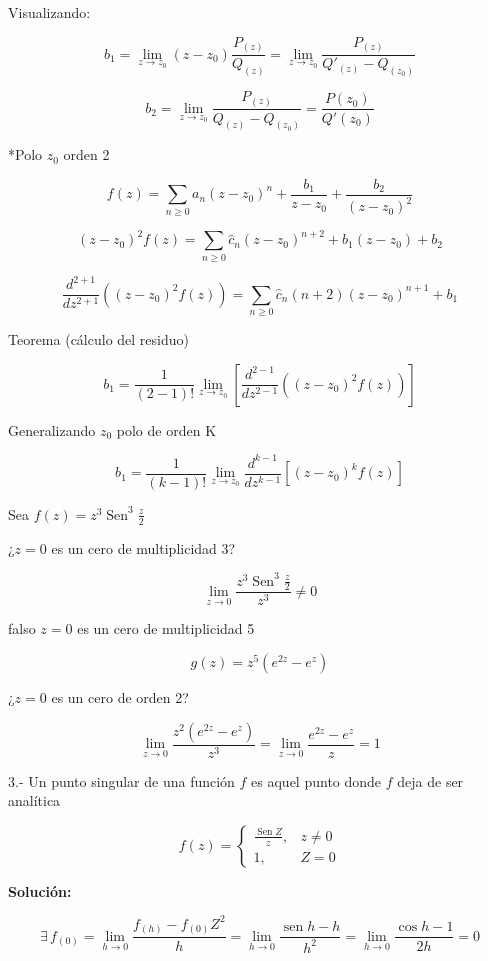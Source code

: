 \documentclass[a4paper,12pt]{article}
\begin{document}

Visualizando:

\[ b_1 = \lim_{z \to z_0} (z - z_0) \frac{P_{(z)}}{Q_{(z)}} = \lim_{z \to z_0} \frac{P_{(z)}}{Q'_{(z)} - Q_{(z_0)}} \]

\[ b_2 = \lim_{z \to z_0} \frac{P_{(z)}}{Q_{(z)} - Q_{(z_0)}} = \frac{P(z_0)}{Q'(z_0)} \]

*Polo $z_0$ orden 2

\[ f(z) = \sum_{n \geq 0} a_n (z - z_0)^n + \frac{b_1}{z - z_0} + \frac{b_2}{(z - z_0)^2} \]

\[ (z - z_0)^2 f(z) = \sum_{n \geq 0} \hat{c}_n (z - z_0)^{n+2} + b_1 (z - z_0) + b_2 \]

\[ \frac{d^{2+1}}{dz^{2+1}} \left((z - z_0)^2 f(z)\right) = \sum_{n \geq 0} \hat{c}_n (n + 2) (z - z_0)^{n+1} + b_1 \]

Teorema (cálculo del residuo)

\[ b_1 = \frac{1}{(2-1)!} \lim_{z \to z_0} \left[ \frac{d^{2-1}}{dz^{2-1}} \left((z - z_0)^2 f(z)\right) \right] \]

Generalizando $z_0$ polo de orden K

\[ b_1 = \frac{1}{(k-1)!} \lim_{z \to z_0} \frac{d^{k-1}}{dz^{k-1}} \left[(z - z_0)^k f(z)\right] \]

Sea $f(z) = z^3 \operatorname{Sen}^3 \frac{z}{2}$

¿$z = 0$ es un cero de multiplicidad 3?

\[ \lim_{z \to 0} \frac{z^3 \operatorname{Sen}^3 \frac{z}{2}}{z^3} \neq 0 \]

falso $z = 0$ es un cero de multiplicidad 5

\[ g(z) = z^5 \left(e^{2z} - e^z\right) \]



¿$z = 0$ es un cero de orden 2?

\[ \lim_{z \to 0} \frac{z^2 \left(e^{2z} - e^z\right)}{z^3} = \lim_{z \to 0} \frac{e^{2z} - e^z}{z} = 1 \]

3.- Un punto singular de una función $f$ es aquel punto donde $f$ deja de ser analítica

\[ f(z) = \begin{cases}
\frac{\operatorname{Sen} Z}{z}, & z \neq 0 \\
1, & Z = 0
\end{cases} \]

\textbf{Solución:}

\[ \exists \, f_{(0)} = \lim_{h \to 0} \frac{f_{(h)} - f_{(0)} Z^2}{h} = \lim_{h \to 0} \frac{\operatorname{sen} h - h}{h^2} = \lim_{h \to 0} \frac{\cos h - 1}{2h} = 0 \]
\end{document}
